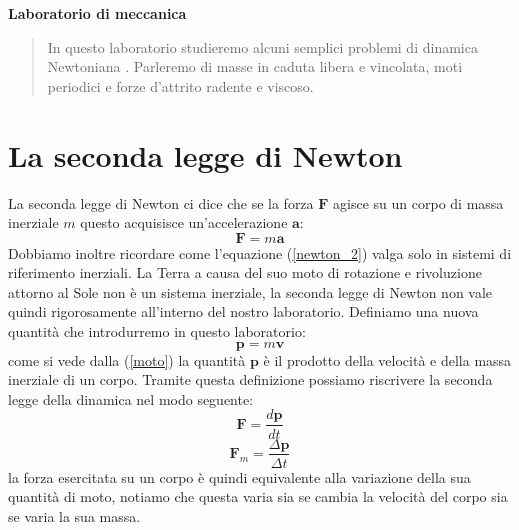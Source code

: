 \documentclass[a4paper,10pt,oneside]{article}
\begin{document}
\begin{center}
\textbf{\huge Laboratorio di meccanica}
\end{center}

\vspace{1cm}

\begin{abstract}
 In questo laboratorio studieremo alcuni semplici problemi di dinamica  Newtoniana . Parleremo di masse in caduta libera e vincolata, moti periodici  e forze d'attrito radente e viscoso.
\end{abstract}

\vspace{1cm}


\section*{La seconda legge di Newton}





La seconda legge di Newton ci dice che se la forza $\mathbf{F}$ agisce su un corpo di massa inerziale $m$ questo acquisisce un'accelerazione $\mathbf{a}$:
\begin{equation}\label{newton_2}
 \mathbf{F}=m\mathbf{a}
\end{equation}
Dobbiamo inoltre ricordare come l'equazione (\ref{newton_2}) valga solo in sistemi di riferimento inerziali. La Terra a causa del suo moto di rotazione e rivoluzione attorno al Sole non è un sistema inerziale, la seconda legge di Newton non vale quindi rigorosamente all'interno del nostro laboratorio. Definiamo una nuova quantità che introdurremo in questo laboratorio:
\begin{equation}\label{moto}
 \mathbf{p}=m\mathbf{v}
\end{equation}
come si vede dalla (\ref{moto}) la quantità $\mathbf{p}$ è il prodotto della velocità e della massa inerziale di un corpo. Tramite questa definizione possiamo riscrivere la seconda legge della dinamica nel modo seguente:
\begin{equation}
 \mathbf{F}=\frac{d\mathbf{p}}{dt}
\end{equation}
\begin{equation}
 \mathbf{F}_m=\frac{\Delta \mathbf{p}}{\Delta t}
\end{equation}
la forza esercitata su un corpo è quindi equivalente alla variazione della sua quantità di moto, notiamo che questa varia sia se cambia la velocità del corpo sia se varia la sua massa.
\end{document}

